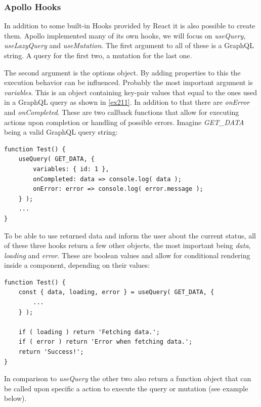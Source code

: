 \subsubsection{Apollo Hooks}
In addition to some built-in Hooks provided by React it is also possible to create them. Apollo implemented many of its own hooks, we will focus on \emph{useQuery}, \emph{useLazyQuery} and \emph{useMutation}.
The first argument to all of these is a GraphQL string. A query for the first two, a mutation for the last one.

The second argument is the options object. By adding properties to this the execution behavior can be influenced. Probably the most important argument is \emph{variables}. This is an object containing key-pair values that equal to the ones used in a GraphQL query as shown in \autoref{ex211}. In addition to that there are \emph{onError} and \emph{onCompleted}. These are two callback functions that allow for executing actions upon completion or handling of possible errors. Imagine \emph{GET\_DATA} being a valid GraphQL query string:
\begin{lstlisting}[caption={The useQuery Hook from Apollo}]
function Test() {
	useQuery( GET_DATA, {
		variables: { id: 1 },
		onCompleted: data => console.log( data );
		onError: error => console.log( error.message );
	} );
	...
}
\end{lstlisting}


To be able to use returned data and inform the user about the current status, all of these three hooks return a few other objects, the most important being \emph{data}, \emph{loading} and \emph{error}. These are boolean values and allow for conditional rendering inside a component, depending on their values:
\newpage
\begin{lstlisting}[caption={Demonstration of the useQuery Hook}]
function Test() {
	const { data, loading, error } = useQuery( GET_DATA, {
		...	
	} );
	
	if ( loading ) return 'Fetching data.';
	if ( error ) return 'Error when fetching data.';
	return 'Success!';
}
\end{lstlisting}

In comparison to \emph{useQuery} the other two also return a function object that can be called upon specific a action to execute the query or mutation (see example below).

